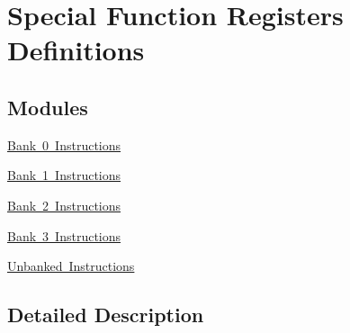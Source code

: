 \hypertarget{group___s_f_rs}{}\section{Special Function Registers Definitions}
\label{group___s_f_rs}
\subsection*{Modules}
\begin{DoxyCompactItemize}
\item 
\mbox{\hyperlink{group___b_a_n_k__0}{Bank 0 Instructions}}
\item 
\mbox{\hyperlink{group___b_a_n_k__1}{Bank 1 Instructions}}
\item 
\mbox{\hyperlink{group___b_a_n_k__2}{Bank 2 Instructions}}
\item 
\mbox{\hyperlink{group___b_a_n_k__3}{Bank 3 Instructions}}
\item 
\mbox{\hyperlink{group___b_a_n_k___u_n}{Unbanked Instructions}}
\end{DoxyCompactItemize}


\subsection{Detailed Description}
